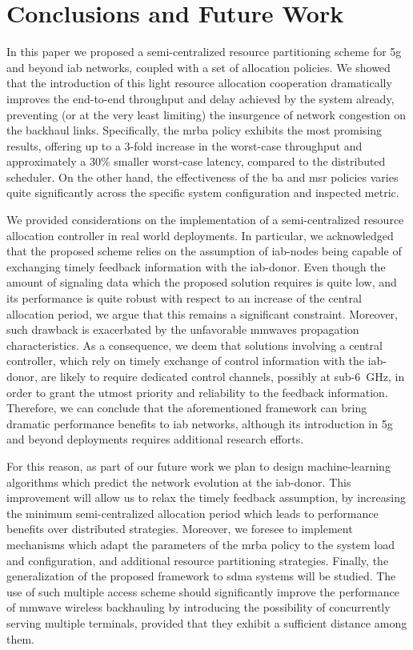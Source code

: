 \section{Conclusions and Future Work}
\label{sec:concl-iab}


In this paper we proposed a semi-centralized resource partitioning scheme for \gls{5g} and beyond \gls{iab} networks, coupled with a set of allocation policies. We showed that the introduction of this light resource allocation cooperation dramatically improves the end-to-end throughput and delay achieved by the system already, preventing (or at the very least limiting) the insurgence of network congestion on the backhaul links. Specifically, the \gls{mrba} policy exhibits the most promising results, offering up to a 3-fold increase in the worst-case throughput and approximately a 30\% smaller worst-case latency, compared to the distributed scheduler. On the other hand, the effectiveness of the \gls{ba} and \gls{msr} policies varies quite significantly across the specific system configuration and inspected metric. %

We provided considerations on the implementation of a semi-centralized resource allocation controller in real world deployments. In particular, we acknowledged that the proposed scheme relies on the assumption of \gls{iab}-nodes being capable of exchanging timely feedback information with the \gls{iab}-donor. Even though the amount of signaling data which the proposed solution requires is quite low, and its performance is quite robust with respect to an increase of the central allocation period, we argue that this remains a significant constraint. Moreover, such drawback is exacerbated by the unfavorable \glspl{mmwave} propagation characteristics.
As a consequence, we deem that solutions involving a central controller, which rely on timely exchange of control information with the \gls{iab}-donor, are likely to require dedicated control channels, possibly at sub-6~{GHz}, in order to grant the utmost priority and reliability to the feedback information. Therefore, we can conclude that the aforementioned framework can bring dramatic performance benefits to \gls{iab} networks, although its introduction in \gls{5g} and beyond deployments requires additional research efforts.

For this reason, as part of our future work we plan to design machine-learning algorithms which predict the network evolution at the \gls{iab}-donor. This improvement will allow us to relax the timely feedback assumption, by increasing the minimum semi-centralized allocation period which leads to performance benefits over distributed strategies. 
Moreover, we foresee to implement mechanisms which adapt the parameters of the \gls{mrba} policy to the system load and configuration, and additional resource partitioning strategies. 
Finally, the generalization of the proposed framework to \gls{sdma} systems will be studied. 
The use of such multiple access scheme should significantly improve the performance of \gls{mmwave} wireless backhauling by introducing the possibility of concurrently serving multiple terminals, provided that they exhibit a sufficient distance among them.

